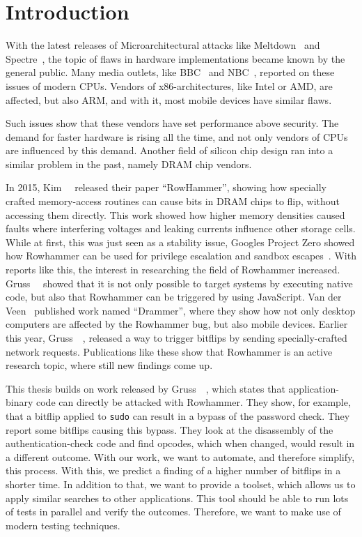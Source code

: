 \chapter{Introduction}\label{sec:intro}

With the latest releases of Microarchitectural attacks like
Meltdown~\cite{meltdown} and Spectre~\cite{spectre}, the topic of flaws in
hardware implementations became known by the general public. Many media outlets,
like BBC~\cite{bbcmeltdown} and NBC~\cite{nbcmeltdown}, reported on these issues
of modern CPUs. Vendors of x86-architectures, like Intel or AMD, are affected,
but also ARM, and with it, most mobile devices have similar flaws.

Such issues show that these vendors have set performance above security. The
demand for faster hardware is rising all the time, and not only vendors of CPUs
are influenced by this demand. Another field of silicon chip design ran into a
similar problem in the past, namely DRAM chip vendors.

In 2015, Kim~\etal~\cite{rowhammergeneral} released their paper ``RowHammer'',
showing how specially crafted memory-access routines can cause bits in DRAM
chips to flip, without accessing them directly. This work showed how higher
memory densities caused faults where interfering voltages and leaking currents
influence other storage cells. While at first, this was just seen as a stability
issue, Google\textquotesingle s Project Zero showed how Rowhammer can be used
for privilege escalation and sandbox escapes~\cite{projectzerorow}. With reports
like this, the interest in researching the field of Rowhammer increased.
Gruss~\etal~\cite{rowhammerjs} showed that it is not only possible to target
systems by executing native code, but also that Rowhammer can be triggered by
using JavaScript. Van der Veen~\etal\cite{drammer} published work named
``Drammer'', where they show how not only desktop computers are affected by the
Rowhammer bug, but also mobile devices. Earlier this year,
Gruss~\etal~\cite{nethammer}, released a way to trigger bitflips by sending
specially-crafted network requests. Publications like these show that Rowhammer
is an active research topic, where still new findings come up.

This thesis builds on work released by Gruss~\etal~\cite{flipinthewall}, which
states that application-binary code can directly be attacked with Rowhammer.
They show, for example, that a bitflip applied to \texttt{sudo} can result in a
bypass of the password check. They report some bitflips causing this bypass.
They look at the disassembly of the authentication-check code and find opcodes,
which when changed, would result in a different outcome. With our work, we want
to automate, and therefore simplify, this process. With this, we predict a
finding of a higher number of bitflips in a shorter time. In addition to that,
we want to provide a toolset, which allows us to apply similar searches to other
applications. This tool should be able to run lots of tests in parallel and
verify the outcomes. Therefore, we want to make use of modern testing
techniques.

